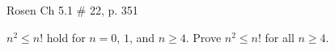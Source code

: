 \begin{questions}










 Rosen Ch 5.1 \# 22, p. 351
    \ifprintanswers
        \vspace{-10pt}
   \fi
\begin{solution}
$n^2 \leq n!$ hold for $n=0$, $1$, and $n \geq 4$.  Prove $n^2 \leq n!$ for all $n \geq 4$.


\end{solution}
\end{questions}
